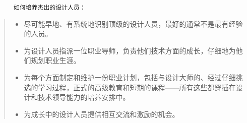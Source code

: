 \documentclass[11pt]{article}
\providecommand{\tightlist}{%
      \setlength{\itemsep}{0pt}\setlength{\parskip}{0pt}}
\begin{document}
\begin{verbatim}
      如何培养杰出的设计人员：
\end{verbatim}

\begin{quote}
\begin{itemize}
\tightlist
\item
  尽可能早地、有系统地识别顶级的设计人员，最好的通常不是最有经验的人员。
\item
  为设计人员指派一位职业导师，负责他们技术方面的成长，仔细地为他们规划职业生涯。\\
\item
  为每个方面制定和维护一份职业计划，包括与设计大师的、经过仔细挑选的学习过程，正式的高级教育和短期的课程------所有这些都穿插在设计和技术领导能力的培养安排中。\\
\item
  为成长中的设计人员提供相互交流和激励的机会。
\end{itemize}
\end{quote}


    
    
    
    
\end{document}
